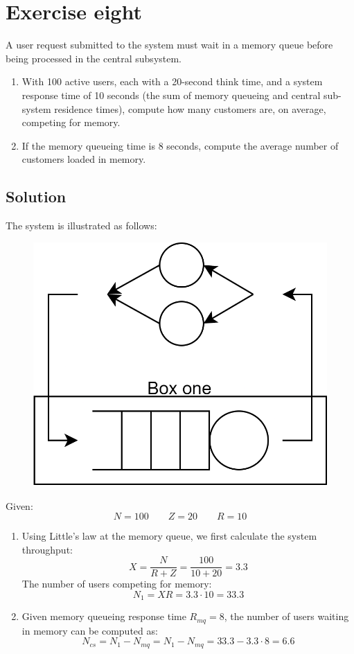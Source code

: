 \section{Exercise eight}

A user request submitted to the system must wait in a memory queue before being processed in the central subsystem.
\begin{enumerate}
    \item With 100 active users, each with a 20-second think time, and a system response time of 10 seconds (the sum of memory queueing and central sub-system residence times), compute how many customers are, on average, competing for memory.
    \item If the memory queueing time is 8 seconds, compute the average number of customers loaded in memory.
\end{enumerate}

\subsection*{Solution}
The system is illustrated as follows:
\begin{figure}[H]
    \centering
    \includegraphics[width=0.35\linewidth]{images/per.png}
\end{figure}
Given:
\[N=100\qquad Z=20 \qquad R=10\]
\begin{enumerate}
    \item Using Little's law at the memory queue, we first calculate the system throughput:
        \[X=\dfrac{N}{R+Z}=\dfrac{100}{10+20}=3.3\]
        The number of users competing for memory:
        \[N_1=XR=3.3\cdot 10=33.3\]
    \item Given memory queueing response time $R_{mq}=8$, the number of users waiting in memory can be computed as:
        \[N_{cs}=N_1-N_{mq}=N_1-N_{mq}=33.3-3.3\cdot 8=6.6\]
\end{enumerate}